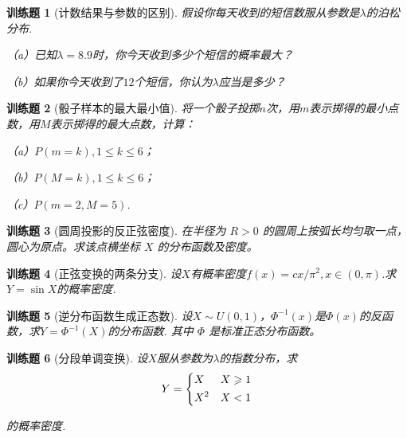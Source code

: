 \documentclass[UTF8,12pt,a4paper,fontset=fandol]{ctexbook}
\newtheorem{exercise}{训练题}[section]
\begin{document}
\begin{exercise}[计数结果与参数的区别]\label{q:Y3.24}
假设你每天收到的短信数服从参数是$\lambda$的泊松分布.

（a）已知$\lambda=8.9$时，你今天收到多少个短信的概率最大？

（b）如果你今天收到了$12$个短信，你认为$\lambda$应当是多少？\par{}\end{exercise}

\begin{exercise}[骰子样本的最大最小值]\label{q:Y3.25}
将一个骰子投掷$n$次，用$m$表示掷得的最小点数，用$M$表示掷得的最大点数，计算：

（a）$P(m=k),1\leqslant k\leqslant 6$；

（b）$P(M=k),1\leqslant k\leqslant 6$；

（c）$P(m=2,M=5)$.\par{}\end{exercise}

\begin{exercise}[圆周投影的反正弦密度]\label{q:Y3.26}
在半径为 $R>0$ 的圆周上按弧长均匀取一点，圆心为原点。求该点横坐标 $X$ 的分布函数及密度。\par{}\end{exercise}

\begin{exercise}[正弦变换的两条分支]\label{q:Y3.28}
设$X$有概率密度$f(x)=cx/\pi^2,x\in (0,\pi)$.求$Y=\sin X$的概率密度.\par{}\end{exercise}

\begin{exercise}[逆分布函数生成正态数]\label{q:Y3.29}
设$X \sim  U(0,1)$，$\Phi^{-1}(x)$是$\Phi(x)$的反函数，求$Y=\Phi^{-1} (X)$的分布函数. 其中 $\Phi$ 是标准正态分布函数。\par{}\end{exercise}

\begin{exercise}[分段单调变换]\label{q:Y3.31}
设$X$服从参数为$\lambda$的指数分布，求
\[Y = \left\{ \begin{gathered}
  X \hfill \quad X\geqslant 1\\
  {X^2} \hfill \quad  X<1\\ 
\end{gathered}  \right.\]

的概率密度.\par{}\end{exercise}
\end{document}
